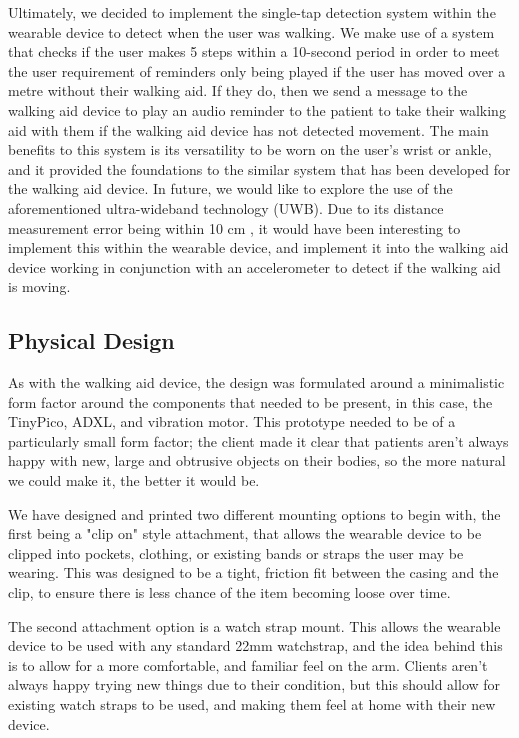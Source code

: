            Ultimately, we decided to implement the single-tap detection system within the wearable device to detect when the user was walking. We make use of a system that checks if the user makes 5 steps within a 10-second period in order to meet the user requirement of reminders only being played if the user has moved over a metre without their walking aid. If they do, then we send a message to the walking aid device to play an audio reminder to the patient to take their walking aid with them if the walking aid device has not detected movement. The main benefits to this system is its versatility to be worn on the user's wrist or ankle, and it provided the foundations to the similar system that has been developed for the walking aid device. In future, we would like to explore the use of the aforementioned ultra-wideband technology (UWB). Due to its distance measurement error being within 10 cm \cite{uwb_accuracy}, it would have been interesting to implement this within the wearable device, and implement it into the walking aid device working in conjunction with an accelerometer to detect if the walking aid is moving.

           \subsection{Physical Design}
            \label{subsec:Design_Decisions_wearable}
                As with the walking aid device, the design was formulated around a minimalistic form factor around the components that needed to be present, in this case, the TinyPico, ADXL, and vibration motor. This prototype needed to be of a particularly small form factor; the client made it clear that patients aren't always happy with new, large and obtrusive objects on their bodies, so the more natural we could make it, the better it would be.

                

                We have designed and printed two different mounting options to begin with, the first being a "clip on" style attachment, that allows the wearable device to be clipped into pockets, clothing, or existing bands or straps the user may be wearing. This was designed to be a tight, friction fit between the casing and the clip, to ensure there is less chance of the item becoming loose over time.

                

                The second attachment option is a watch strap mount. This allows the wearable device to be used with any standard 22mm watchstrap, and the idea behind this is to allow for a more comfortable, and familiar feel on the arm. Clients aren't always happy trying new things due to their condition, but this should allow for existing watch straps to be used, and making them feel at home with their new device.

